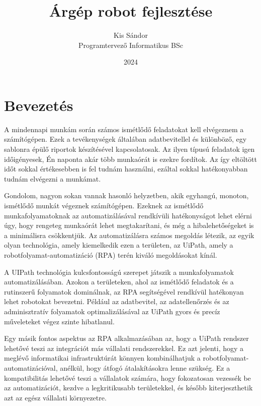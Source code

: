 \documentclass[
]{thesis-ekf}
\theoremstyle{definition}
\theoremstyle{remark}
\begin{document}
\title{Árgép robot fejlesztése}
\author{Kis Sándor\\Programtervező Informatikus BSc}
\date{2024}
\maketitle
\tableofcontents

\chapter*{Bevezetés}
A mindennapi munkám során számos ismétlődő feladatokat kell elvégeznem a számítógépen. Ezek a tevékenységek általában adatbevitellel és különböző, egy sablonra épülő riportok készítésével kapcsolatosak. Az ilyen típusú feladatok igen időigényesek, Én naponta akár több munkaórát is ezekre fordítok. Az így eltöltött időt sokkal értékesebben is fel tudnám használni, ezáltal sokkal hatékonyabban tudnám elvégezni a munkámat.

Gondolom, nagyon sokan vannak hasonló helyzetben, akik egyhangú, monoton, ismétlődő munkát végeznek számítógépen. Ezeknek az ismétlődő munkafolyamatoknak az automatizálásával rendkívüli hatékonyságot lehet elérni úgy, hogy rengeteg munkaórát lehet megtakarítani, és még a hibalehetőségeket is a minimálisra csökkentjük. Az automatizálásra számos megoldás létezik, az egyik olyan technológia, amely kiemelkedik ezen a területen, az UiPath, amely a robotfolyamat-automatizáció (RPA) terén kiváló megoldásokat kínál.

A UIPath technológia kulcsfontosságú szerepet játszik a munkafolyamatok automatizálásában. Azokon a területeken, ahol az ismétlődő feladatok és a rutinszerű folyamatok dominálnak, az RPA segítségével rendkívül hatékonyan lehet robotokat bevezetni. Például az adatbevitel, az adatellenőrzés és az adminisztratív folyamatok optimalizálásával az UiPath gyors és precíz műveleteket végez szinte hibatlanul.

Egy másik fontos aspektus az RPA alkalmazásában az, hogy a UiPath rendszer lehetővé teszi az integrációt más vállalati rendszerekkel. Ez azt jelenti, hogy a meglévő informatikai infrastruktúrát könnyen kombinálhatjuk a robotfolyamat-automatizációval, anélkül, hogy átfogó átalakításokra lenne szükség. Ez a kompatibilitás lehetővé teszi a vállalatok számára, hogy fokozatosan vezessék be az automatizációt, kezdve a legkritikusabb területekkel, és később kiterjeszthetik azt az egész vállalati környezetre.
\end{document}
